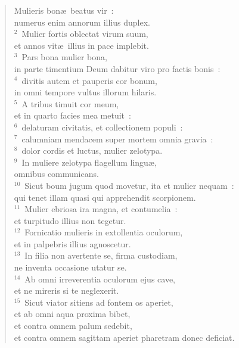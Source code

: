 \begin{flushleft}\begin{verse}\vspace{-19pt}\hspace{6pt}Mulieris bon\ae\ beatus vir~:\\\hspace{6pt} numerus enim annorum illius duplex.\\
${}^{2}$~Mulier fortis oblectat virum suum,\\ et annos vit\ae\ illius in pace implebit.\\
${}^{3}$~Pars bona mulier bona,\\ in parte timentium Deum dabitur viro pro factis bonis~:\\
${}^{4}$~divitis autem et pauperis cor bonum,\\ in omni tempore vultus illorum hilaris.\\
${}^{5}$~A tribus timuit cor meum,\\ et in quarto facies mea metuit~:\\
${}^{6}$~delaturam civitatis, et collectionem populi~:\\
${}^{7}$~calumniam mendacem super mortem omnia gravia~:\\
${}^{8}$~dolor cordis et luctus, mulier zelotypa.\\
${}^{9}$~In muliere zelotypa flagellum lingu\ae ,\\ omnibus communicans.\\
${}^{10}$~Sicut boum jugum quod movetur, ita et mulier nequam~:\\ qui tenet illam quasi qui apprehendit scorpionem.\\
${}^{11}$~Mulier ebriosa ira magna, et contumelia~:\\ et turpitudo illius non tegetur.\\
${}^{12}$~Fornicatio mulieris in extollentia oculorum,\\ et in palpebris illius agnoscetur.\\
${}^{13}$~In filia non avertente se, firma custodiam,\\ ne inventa occasione utatur se.\\
${}^{14}$~Ab omni irreverentia oculorum ejus cave,\\ et ne mireris si te neglexerit.\\
${}^{15}$~Sicut viator sitiens ad fontem os aperiet,\\ et ab omni aqua proxima bibet,\\ et contra omnem palum sedebit,\\ et contra omnem sagittam aperiet pharetram donec deficiat.\\

\end{verse}
\end{flushleft}
